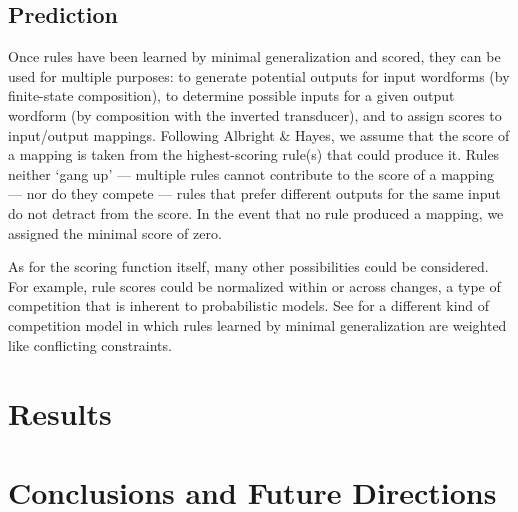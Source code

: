 \documentclass[11pt]{article}
\begin{document}
\subsection{Prediction}

Once rules have been learned by minimal generalization and scored, they can be used for multiple purposes: to generate potential outputs for input wordforms (by finite-state composition), to determine possible inputs for a given output wordform (by composition with the inverted transducer), and to assign scores to input/output mappings. Following Albright \& Hayes, we assume that the score of a mapping is taken from the highest-scoring rule(s) that could produce it. Rules neither `gang up' --- multiple rules cannot contribute to the score of a mapping --- nor do they compete --- rules that prefer different outputs for the same input do not detract from the score. In the event that no rule produced a mapping, we assigned the minimal score of zero.

As for the scoring function itself, many other possibilities could be considered. For example, rule scores could be normalized within or across changes, a type of competition that is inherent to probabilistic models. See \citet{albright2006} for a different kind of competition model in which rules learned by minimal generalization are weighted like conflicting constraints.


\section{Results}






\section{Conclusions and Future Directions}
\end{document}
